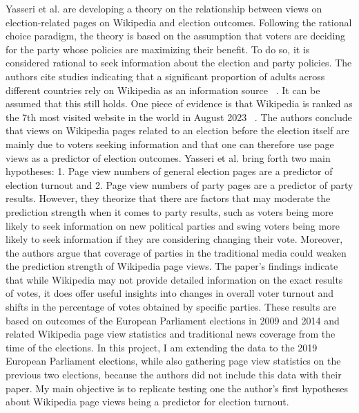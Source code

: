 Yasseri et al. are developing a theory on the relationship between views on election-related pages on Wikipedia and election outcomes. Following the rational choice paradigm, the theory is based on the assumption that voters are deciding for the party whose policies are maximizing their benefit. To do so, it is considered rational to seek information about the election and party policies. The authors cite studies indicating that a significant proportion of adults across different countries rely on Wikipedia as an information source ~\cite{Rainie2020May, Ofcom2015}. It can be assumed that this still holds. One piece of evidence is that Wikipedia is ranked as the 7th most visited website in the world in August 2023 ~\cite{BibEntry2023Aug}. The authors conclude that views on Wikipedia pages related to an election before the election itself are mainly due to voters seeking information and that one can therefore use page views as a predictor of election outcomes. Yasseri et al. bring forth two main hypotheses: 1. Page view numbers of general election pages are a predictor of election turnout and 2. Page view numbers of party pages are a predictor of party results. However, they theorize that there are factors that may moderate the prediction strength when it comes to party results, such as voters being more likely to seek information on new political parties and swing voters being more likely to seek information if they are considering changing their vote. Moreover, the authors argue that coverage of parties in the traditional media could weaken the prediction strength of Wikipedia page views. The paper's findings indicate that while Wikipedia may not provide detailed information on the exact results of votes, it does offer useful insights into changes in overall voter turnout and shifts in the percentage of votes obtained by specific parties. These results are based on outcomes of the European Parliament elections in 2009 and 2014 and related Wikipedia page view statistics and traditional news coverage from the time of the elections. In this project, I am extending the data to the 2019 European Parliament elections, while also gathering page view statistics on the previous two elections, because the authors did not include this data with their paper. My main objective is to replicate testing one the author's first hypotheses about Wikipedia page views being a predictor for election turnout.
